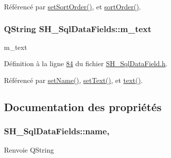 Référencé par \hyperlink{classSH__SqlDataFields_a32a7c040a081d39594245e1a4a68f70d}{set\-Sort\-Order()}, et \hyperlink{classSH__SqlDataFields_af7ecc3a493545e81e6959d778352d9ac}{sort\-Order()}.

\hypertarget{classSH__SqlDataFields_a55352d3aea0863fcab26c948babe8523}{
\subsubsection[{m\-\_\-text}]{\setlength{\rightskip}{0pt plus 5cm}Q\-String S\-H\-\_\-\-Sql\-Data\-Fields\-::m\-\_\-text\hspace{0.3cm}{\ttfamily [private]}}}\label{classSH__SqlDataFields_a55352d3aea0863fcab26c948babe8523}


m\-\_\-text 



Définition à la ligne \hyperlink{SH__SqlDataField_8h_source_l00084}{84} du fichier \hyperlink{SH__SqlDataField_8h_source}{S\-H\-\_\-\-Sql\-Data\-Field.\-h}.



Référencé par \hyperlink{classSH__SqlDataFields_a8d7b864a4ad5513af9e4c47a0d9919e8}{set\-Name()}, \hyperlink{classSH__SqlDataFields_ae098408de73ecbd532de8f44dea2b6d0}{set\-Text()}, et \hyperlink{classSH__SqlDataFields_a7d8b3f434dc35ee83a9d8d9811e0e8eb}{text()}.



\subsection{Documentation des propriétés}
\hypertarget{classSH__SqlDataFields_ac7823e9c229edea389fc55ed73bf071b}{
\subsubsection[{name}]{\setlength{\rightskip}{0pt plus 5cm}S\-H\-\_\-\-Sql\-Data\-Fields\-::name\hspace{0.3cm}{\ttfamily [read]}, {\ttfamily [write]}}}\label{classSH__SqlDataFields_ac7823e9c229edea389fc55ed73bf071b}
\begin{DoxyReturn}{Renvoie}
Q\-String 
\end{DoxyReturn}


